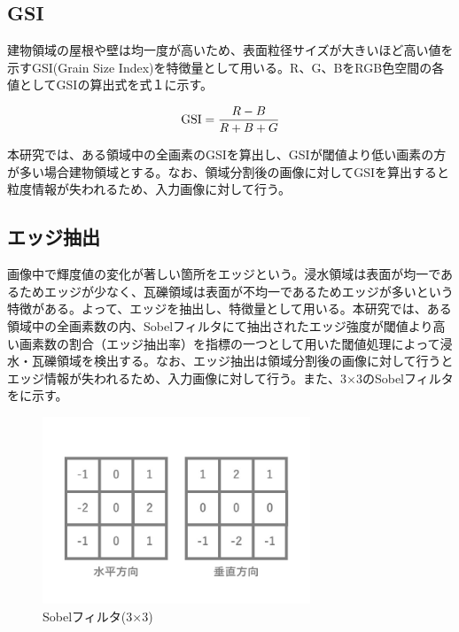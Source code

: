 \documentclass[../Thesis]{subfiles}
\begin{document}

\subsection{GSI}
  建物領域の屋根や壁は均一度が高いため、表面粒径サイズが大きいほど高い値を示すGSI(Grain Size Index)を特徴量として用いる。R、G、BをRGB色空間の各値としてGSIの算出式を式１に示す。
  
  \begin{equation}
    {\rm GSI} = \frac{R-B}{R+B+G} \nonumber \\
  \end{equation}

  本研究では、ある領域中の全画素のGSIを算出し、GSIが閾値より低い画素の方が多い場合建物領域とする。なお、領域分割後の画像に対してGSIを算出すると粒度情報が失われるため、入力画像に対して行う。
  
\subsection{エッジ抽出}
  画像中で輝度値の変化が著しい箇所をエッジという。浸水領域は表面が均一であるためエッジが少なく、瓦礫領域は表面が不均一であるためエッジが多いという特徴がある。よって、エッジを抽出し、特徴量として用いる。本研究では、ある領域中の全画素数の内、Sobelフィルタにて抽出されたエッジ強度が閾値より高い画素数の割合（エッジ抽出率）を指標の一つとして用いた閾値処理によって浸水・瓦礫領域を検出する。なお、エッジ抽出は領域分割後の画像に対して行うとエッジ情報が失われるため、入力画像に対して行う。また、3×3のSobelフィルタをに示す。

	\begin{figure}[h]
		\centering
		\includegraphics[width=8cm]{img/sobel.jpg}
		\caption{Sobelフィルタ(3×3)}
		\label{img03}
  \end{figure}
\end{document}
